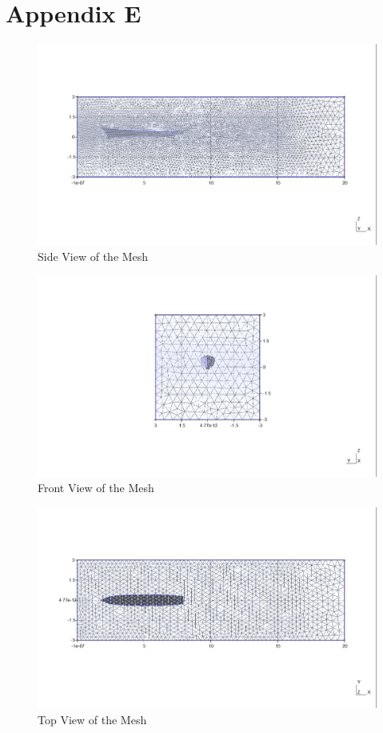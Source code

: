 \documentclass[12pt]{article} %
\begin{document}
\section*{Appendix E}
\begin{figure}[ht]
    \centering
    \includegraphics[width=1\textwidth]{Mesh_3.png}
    \caption{Side View of the Mesh}
\end{figure}
\begin{figure}[ht]
    \centering
    \includegraphics[width=1\textwidth]{Mesh_2.png}
    \caption{Front View of the Mesh}
\end{figure}
\begin{figure}[ht]
    \centering
    \includegraphics[width=1\textwidth]{Mesh_4.png}
    \caption{Top View of the Mesh}
\end{figure}
\end{document}
